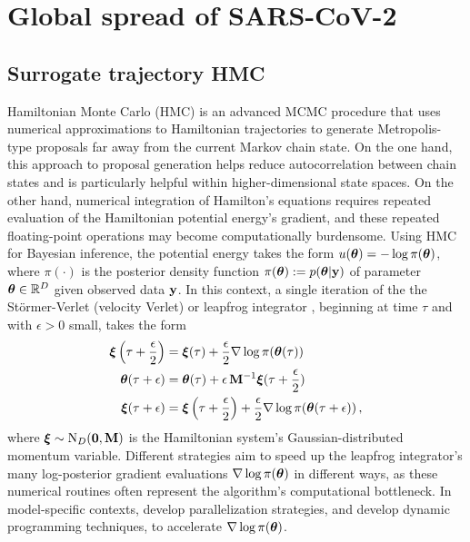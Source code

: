 \documentclass[12pt]{article} %
\begin{document}
\section{Global spread of SARS-CoV-2}




\subsection{Surrogate trajectory HMC}\label{sec:surrHmc}


Hamiltonian Monte Carlo (HMC) \citep{duane1987hybrid,neal2011mcmc} is an advanced MCMC procedure that uses numerical approximations to Hamiltonian trajectories to generate Metropolis-type \citep{metropolis1953equation} proposals far away from the current Markov chain state.  On the one hand, this approach to proposal generation helps reduce autocorrelation between chain states and is particularly helpful within higher-dimensional state spaces.  On the other hand, numerical integration of Hamilton's equations requires repeated evaluation of the Hamiltonian potential energy's gradient, and these repeated floating-point operations may become computationally burdensome.   Using HMC for Bayesian inference, the potential energy takes the form $u(\boldsymbol{\theta})=-\log \pi(\boldsymbol{\theta})$, where $\pi(\cdot)$ is the posterior density function $\pi(\boldsymbol{\theta}):=p(\boldsymbol{\theta}|\mathbf{y})$ of parameter $\boldsymbol{\theta}\in\mathbb{R}^D$ given observed data $\mathbf{y}$.  In this context, a single iteration of the the St\"{o}rmer-Verlet (velocity Verlet) or leapfrog integrator \citep{leimkuhler2004simulating}, beginning at time $\tau$ and with $\epsilon>0$ small, takes the form
\begin{align}\label{eq:leap}
	\boldsymbol{\xi}\left(\tau + \frac{\epsilon}{2}\right) &= \boldsymbol{\xi}(\tau) + \frac{\epsilon}{2} \nabla \log \pi(\boldsymbol{\theta}(\tau))  \\  \nonumber
	\boldsymbol{\theta}(\tau+\epsilon) &= \boldsymbol{\theta}(\tau) + \epsilon \, \mathbf{M}^{-1}\boldsymbol{\xi}(\tau+\frac{\epsilon}{2}) \\ \nonumber
	\boldsymbol{\xi}(\tau + \epsilon) &= \boldsymbol{\xi}\left(\tau+\frac{\epsilon}{2}\right) + \frac{\epsilon}{2} \nabla \log \pi(\boldsymbol{\theta}(\tau+\epsilon))  \, ,
\end{align}
where $\boldsymbol{\xi} \sim \mbox{N}_D(\boldsymbol{0},\mathbf{M})$ is the Hamiltonian system's Gaussian-distributed momentum variable.  
Different strategies aim to speed up the leapfrog integrator's many log-posterior gradient evaluations $\nabla \log \pi (\boldsymbol{\theta})$ in different ways, as these numerical routines often represent the algorithm's computational bottleneck.  In model-specific contexts, \citet{holbrook2021massive,holbrook2022bayesian,holbrook2022viral} develop parallelization strategies, and \citet{ji2020gradients} develop dynamic programming techniques, to accelerate $\nabla \log \pi (\boldsymbol{\theta})$.
\end{document}
